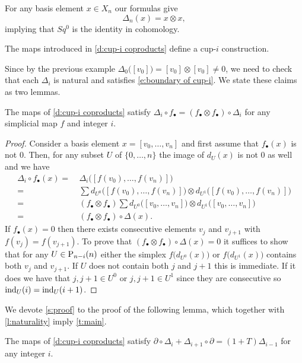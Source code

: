 \begin{example} \label{e:Sq0 is the identity}
	For any basis element $x \in X_n$ our formulas give
	\begin{equation*}
	\Delta_n(x) = x \otimes x,
	\end{equation*}
	implying that $Sq^0$ is the identity in cohomology.
\end{example}

\begin{theorem} \label{t:main}
	The maps introduced in \cref{d:cup-i coproducts} define a cup-$i$ construction.
\end{theorem}

Since by the previous example $\Delta_0\big([v_0]\big) = [v_0] \otimes [v_0] \neq 0$, we need to check that each $\Delta_i$ is natural and satisfies \eqref{e:boundary of cup-i}.
We state these claims as two lemmas.

\begin{lemma} \label{l:naturality}
	The maps of \cref{d:cup-i coproducts} satisfy $\Delta_i \circ f_\bullet = (f_\bullet \otimes f_\bullet) \circ \Delta_i$ for any simplicial map $f$ and integer $i$.
\end{lemma}

\begin{proof}
	Consider a basis element $x = [v_0, \dots, v_n]$ and first assume that $f_\bullet(x)$ is not $0$.
	Then, for any subset $U$ of $\{0, \dots, n\}$ the image of $d_U(x)$ is not $0$ as well and we have
	\begin{align*}
	\Delta_i \circ f_\bullet(x) =\ &
	\Delta_i \big([f(v_0), \dots, f(v_n)]\big) \\ =\ &
	\sum d_{U^0} \big([f(v_0), \dots, f(v_n)]\big) \otimes d_{U^1} \big([f(v_0), \dots, f(v_n)]\big) \\ =\ &
	(f_\bullet \otimes f_\bullet) \sum d_{U^0} \big([v_0, \dots, v_n]\big) \otimes d_{U^1} \big([v_0, \dots, v_n]\big) \\ =\ &
	(f_\bullet \otimes f_\bullet) \circ \Delta(x).
	\end{align*}
	If $f_\bullet(x) = 0$ then there exists consecutive elements $v_j$ and $v_{j+1}$ with $f(v_j) = f(v_{j+1})$.
	To prove that $(f_\bullet \otimes f_\bullet) \circ \Delta(x) = 0$ it suffices to show that for any $U \in \P_{n-i}(n)$ either the simplex $f \big(d_{U^0}(x) \big)$ or $f \big( d_{U^1}(x) \big)$ contains both $v_j$ and $v_{j+1}$.
	If $U$ does not contain both $j$ and $j+1$ this is immediate.
	If it does we have that	$j, j+1 \in U^0$ or $j, j+1 \in U^1$ since they are consecutive so $\ind_U(i) = \ind_U(i+1)$.
\end{proof}

We devote \cref{s:proof} to the proof of the following lemma, which together with \cref{l:naturality} imply \cref{t:main}.

\begin{lemma} \label{l:main}
	The maps of \cref{d:cup-i coproducts} satisfy $\partial \circ \Delta_{i} + \Delta_{i+1} \circ \partial = (1+T) \Delta_{i-1}$ for any integer $i$.
\end{lemma}